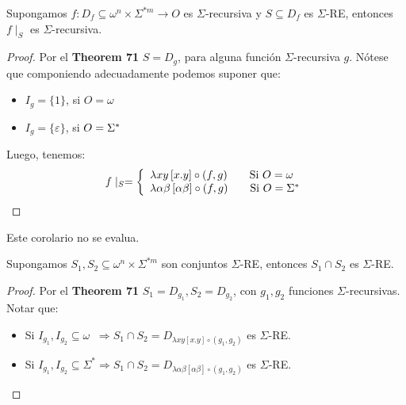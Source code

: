   \begin{corollary}
    \PN Supongamos $f: D_{f} \subseteq \omega^{n} \times \Sigma^{\ast m} \rightarrow O$ es $\Sigma$-recursiva y
    $S\subseteq D_{f}$ es $\Sigma$-RE, entonces $f \mid_{S}$ es $\Sigma$-recursiva.
  \end{corollary}
  \begin{proof}
    \PN Por el \textbf{Theorem 71} $S=D_{g}$, para alguna función $\Sigma$-recursiva $g$. Nótese que componiendo
    adecuadamente podemos suponer que:
    \begin{itemize}
      \item $I_{g} = \{ 1\}$, si $O = \omega$
      \item $I_{g} = \{\varepsilon\}$, si $O = \Sigma^{\ast}$
    \end{itemize}

    \PN Luego, tenemos:
    \[
      f\mid_{S} = \left\{
        \begin{array}{lll}
          \lambda xy \left[x.y\right] \circ (f,g) \qquad \text{Si } O = \omega \\
          \lambda \alpha \beta \left[ \alpha \beta \right] \circ (f,g) \qquad \text{Si } O = \Sigma^{\ast}
        \end{array} \right.
    \]
  \end{proof}

  \begin{corollary}
    \PN Este corolario no se evalua.
  \end{corollary}

  \begin{corollary}
    \PN Supongamos $S_{1}, S_{2} \subseteq \omega^{n} \times \Sigma^{\ast m}$ son conjuntos $\Sigma$-RE, entonces
    $S_{1} \cap S_{2}$ es $\Sigma$-RE.
  \end{corollary}
  \begin{proof}
    \PN Por el \textbf{Theorem 71} $S_{1} = D_{g_{1}}, S_{2} = D_{g_{2}}$, con $g_{1}, g_{2}$ funciones
    $\Sigma$-recursivas. Notar que:

    \begin{itemize}
      \item Si $I_{g_{1}}, I_{g_{2}} \subseteq \omega \;\; \Rightarrow S_{1} \cap S_{2} = D_{\lambda xy \left[x.y\right]
      \circ (g_{1},g_{2})}$ es $\Sigma$-RE.
      \item Si $I_{g_{1}}, I_{g_{2}} \subseteq \Sigma^{\ast} \Rightarrow S_{1} \cap S_{2} = D_{\lambda \alpha\beta
        \left[\alpha\beta\right] \circ (g_{1},g_{2})}$ es $\Sigma$-RE.
    \end{itemize}
  \end{proof}

